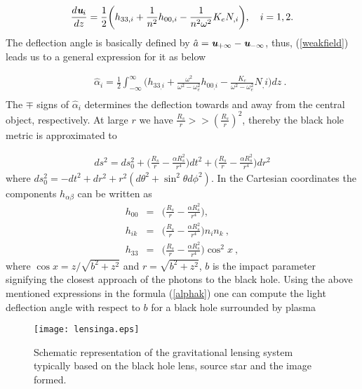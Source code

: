 \documentclass[final,5p,times,twocolumn,unknownkeysallowed]{elsarticle}
\begin{document}
\begin{align}\label{weakfield}
\frac{d\textit{\textbf{u}}_i}{dz}=\frac{1}{2}\bigg(h_{33,i}+\frac{1}{n^2}h_{00,i}-\frac{1}{n^2\omega^2}K_eN_{,i}\bigg), \quad i=1,2.
\end{align}
The deflection angle is basically defined by $\hat{a}=\textit{\textbf{u}}_{+\infty}-\textit{\textbf{u}}_{-\infty}$, thus, (\ref{weakfield}) leads us to
a general expression for it as below

\begin{eqnarray}\label{alphak}
&&\hat{\alpha}_i= \frac{1}{2} \int_{-\infty}^\infty \bigg(h_{33_,i} +
\frac{ \omega^2}{\omega^2-\omega_e^2}h_{00_,i}-\frac{K_e }{\omega^2-\omega_e^2}N{_,i}\bigg) dz \ .\nonumber \\
\end{eqnarray}
The $\mp$ signs of $\hat{\alpha}_i$ determines the deflection towards and away from the central object, respectively.
At large $r$ we have $\frac{R_s}{r}>>(\frac{R_s}{r})^2$, thereby the black hole metric is approximated to

\begin{align}
ds^2=ds^2_0+\bigg(\frac{R_s}{r}-\frac{\alpha R^2_s}{r^4}\bigg)dt^2+\bigg(\frac{R_s}{r}-\frac{\alpha R^2_s}{r^4}\bigg)dr^2
\end{align}
where $ds^2_0=-dt^2+dr^2+r^2(d\theta^2+\sin^2\theta d\phi^2)$. In the Cartesian coordinates the components $h_{\alpha\beta}$ can be written as
%
\begin{eqnarray}
 h_{00}&=&\bigg(\frac{R_s}{r}-\frac{\alpha R^2_s}{r^4}\bigg), \nonumber \\  h_{ik}&=&\bigg(\frac{R_s}{r}-\frac{\alpha R^2_s}{r^4}\bigg)n_{i}n_{k}\ ,\nonumber \\
 h_{33}&=&\bigg(\frac{R_s}{r}-\frac{\alpha R^2_s}{r^4}\bigg)\cos^2x \ ,
\end{eqnarray}\label{h}
where $\cos x=z/\sqrt{b^2+z^2}$ and $r=\sqrt{b^2+z^2}$, $b$ is the impact parameter signifying the closest approach of the photons to the black hole.
Using the above mentioned expressions in the formula (\ref{alphak}) one can compute the light deflection angle with respect to $b$
for a black hole surrounded by plasma

\begin{figure}[h!]
\texttt{[image: lensinga.eps]}
\caption{Schematic representation of the gravitational lensing system typically based on the black hole lens, source star
and the image formed.}\label{Lensingsystem}
\end{figure}
\end{document}

